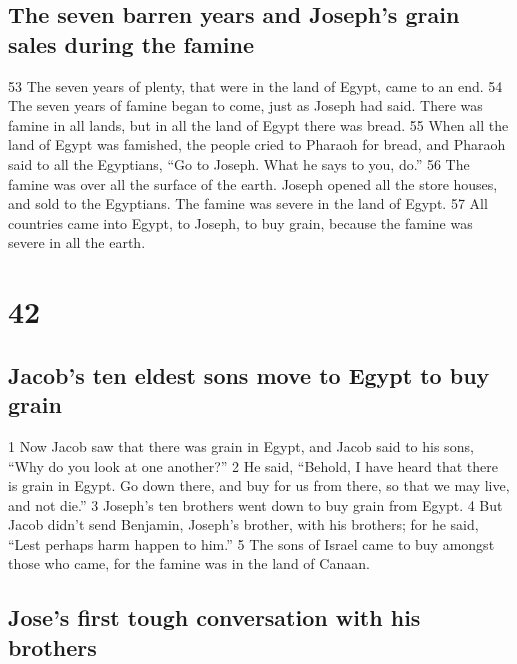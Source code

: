 \hypertarget{the-seven-barren-years-and-josephs-grain-sales-during-the-famine}{%
\subsection{The seven barren years and Joseph's grain sales during the
famine}\label{the-seven-barren-years-and-josephs-grain-sales-during-the-famine}}

{53} The seven years of plenty, that were in the land of Egypt, came to
an end. {54} The seven years of famine began to come, just as Joseph had
said. There was famine in all lands, but in all the land of Egypt there
was bread. {55} When all the land of Egypt was famished, the people
cried to Pharaoh for bread, and Pharaoh said to all the Egyptians, ``Go
to Joseph. What he says to you, do.'' {56} The famine was over all the
surface of the earth. Joseph opened all the store houses, and sold to
the Egyptians. The famine was severe in the land of Egypt. {57} All
countries came into Egypt, to Joseph, to buy grain, because the famine
was severe in all the earth.

\hypertarget{section-41}{%
\section{42}\label{section-41}}

\hypertarget{jacobs-ten-eldest-sons-move-to-egypt-to-buy-grain}{%
\subsection{Jacob's ten eldest sons move to Egypt to buy
grain}\label{jacobs-ten-eldest-sons-move-to-egypt-to-buy-grain}}

{1} Now Jacob saw that there was grain in Egypt, and Jacob said to his
sons, ``Why do you look at one another?'' {2} He said, ``Behold, I have
heard that there is grain in Egypt. Go down there, and buy for us from
there, so that we may live, and not die.'' {3} Joseph's ten brothers
went down to buy grain from Egypt. {4} But Jacob didn't send Benjamin,
Joseph's brother, with his brothers; for he said, ``Lest perhaps harm
happen to him.'' {5} The sons of Israel came to buy amongst those who
came, for the famine was in the land of Canaan.

\hypertarget{joses-first-tough-conversation-with-his-brothers}{%
\subsection{Jose's first tough conversation with his
brothers}\label{joses-first-tough-conversation-with-his-brothers}}

